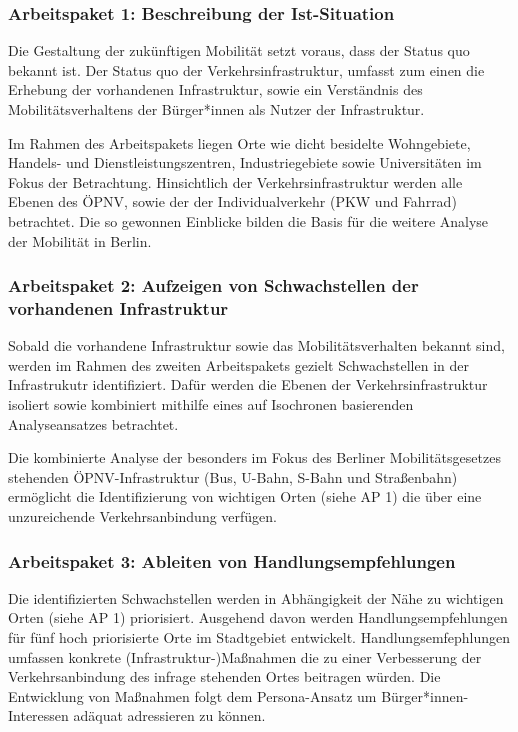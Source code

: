 \subsubsection{Arbeitspaket 1: Beschreibung der Ist-Situation}

Die Gestaltung der zukünftigen Mobilität setzt voraus, dass der Status quo bekannt ist. Der Status quo der Verkehrsinfrastruktur, umfasst zum einen die Erhebung der vorhandenen Infrastruktur, sowie ein Verständnis des Mobilitätsverhaltens der Bürger*innen als Nutzer der Infrastruktur.

Im Rahmen des Arbeitspakets liegen Orte wie dicht besidelte Wohngebiete, Handels- und Dienstleistungszentren, Industriegebiete sowie Universitäten im Fokus der Betrachtung. Hinsichtlich der Verkehrsinfrastruktur werden alle Ebenen des ÖPNV, sowie der der Individualverkehr (PKW und Fahrrad) betrachtet. Die so gewonnen Einblicke bilden die Basis für die weitere Analyse der Mobilität in Berlin.

\subsubsection{Arbeitspaket 2: Aufzeigen von Schwachstellen der vorhandenen Infrastruktur}

Sobald die vorhandene Infrastruktur sowie das Mobilitätsverhalten bekannt sind, werden im Rahmen des zweiten Arbeitspakets gezielt Schwachstellen in der Infrastrukutr identifiziert. Dafür werden die  Ebenen der Verkehrsinfrastruktur isoliert sowie kombiniert mithilfe eines auf Isochronen basierenden Analyseansatzes betrachtet.

Die kombinierte Analyse der besonders im Fokus des Berliner Mobilitätsgesetzes stehenden ÖPNV-Infrastruktur (Bus, U-Bahn, S-Bahn und Straßenbahn) ermöglicht die Identifizierung von wichtigen Orten (siehe AP 1) die über eine unzureichende Verkehrsanbindung verfügen.

\subsubsection{Arbeitspaket 3: Ableiten von Handlungsempfehlungen}

Die identifizierten Schwachstellen werden in Abhängigkeit der Nähe zu wichtigen Orten (siehe AP 1) priorisiert. Ausgehend davon werden Handlungsempfehlungen für fünf hoch priorisierte Orte im Stadtgebiet entwickelt. Handlungsemfephlungen umfassen konkrete (Infrastruktur-)Maßnahmen die zu einer Verbesserung der Verkehrsanbindung des infrage stehenden Ortes beitragen würden. Die Entwicklung von Maßnahmen folgt dem Persona-Ansatz um Bürger*innen-Interessen adäquat adressieren zu können.

